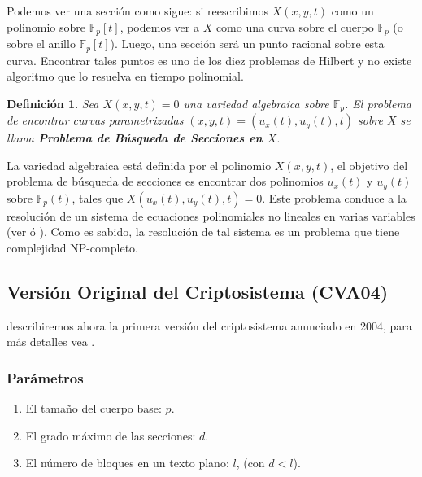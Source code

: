 \documentclass[11pt]{article}
\newcommand{\Fp}{\mathbb{F}_p}
\numberwithin{equation}{section} %
\numberwithin{figure}{section} %
\numberwithin{table}{section} %
\newtheorem{defi}{{\bf Definici\'on }}[subsection]
\begin{document}
			Podemos ver una secci\'on como sigue: si reescribimos $X(x, y, t)$ como un polinomio sobre $\Fp [t]$, podemos ver a $X$ como una curva sobre el cuerpo $\Fp$ (o sobre el anillo $\Fp[t]$). Luego, una secci\'on ser\'a un punto racional sobre esta curva. Encontrar tales puntos es uno de los diez problemas de Hilbert y no existe algoritmo que lo resuelva en tiempo polinomial.

			\begin{defi}
 				Sea $X(x, y, t) = 0$ una variedad algebraica sobre $\Fp$. El problema de encontrar curvas parametrizadas $(x, y, t) = (u_x (t), u_y (t), t)$ sobre $X$ se llama \textbf{Problema de B\'usqueda de Secciones en $X$}.
			\end{defi}

			La variedad algebraica est\'a definida por el polinomio $X(x, y, t)$, el objetivo del problema de b\'usqueda de secciones es encontrar dos polinomios $u_x(t)$ y $u_y (t)$ sobre $\Fp (t)$, tales que $X(u_x (t), u_y (t), t) = 0$. Este problema conduce a la resoluci\'on de un sistema de ecuaciones polinomiales no lineales en varias variables (ver \cite{AGM09} \'o \cite{Con15}). Como es sabido, la resoluci\'on de tal sistema es un problema que tiene complejidad NP-completo.


		\subsection{Versi\'on Original del Criptosistema (CVA04)}
		\label{22CVA1}	%

			describiremos ahora la primera versi\'on del criptosistema anunciado en 2004, para m\'as detalles vea \cite{AG04}.


			\subsubsection{Par\'ametros}
			\label{221Para}

				\begin{enumerate}
					\item El tamaño del cuerpo base: $p$.
					\item El grado m\'aximo de las secciones: $d$.
					\item El n\'umero de bloques en un texto plano: $l$, (con $d<l$).
				\end{enumerate}
\end{document}
